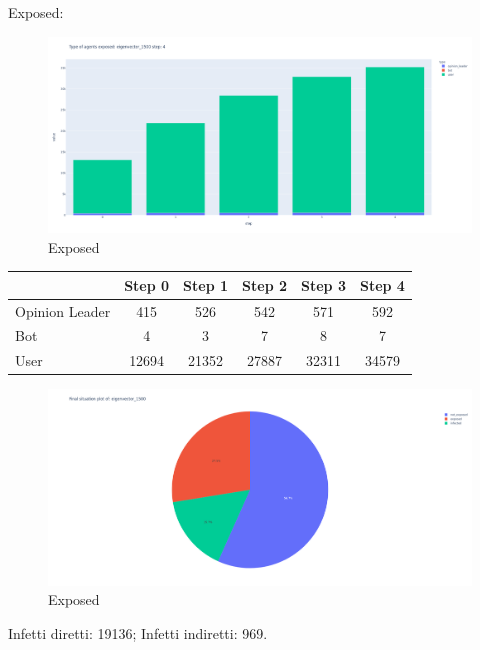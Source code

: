         Exposed:
        \begin{figure}[H]
            \includegraphics[width=16cm]{resources/charts/eig_1500_bar.png}
            \caption{Exposed}
            \label{fig:eig_1500_bar}
        \end{figure}
        
        \begin{table}[H]
            \centering
            \begin{tabular}{|l|c|c|c|c|c|}
            \hline
                           & Step 0 & Step 1 & Step 2 & Step 3 & Step 4 \\ \hline
            Opinion Leader & 415    & 526    & 542    & 571    & 592    \\ \hline
            Bot            & 4      & 3      & 7      & 8      & 7      \\ \hline
            User           & 12694  & 21352  & 27887  & 32311  & 34579  \\ \hline
            \end{tabular}
        \end{table}
        
        \begin{figure}[H]
            \includegraphics[width=16cm]{resources/charts/eig_1500_pie.png}
            \caption{Exposed}
            \label{fig:btw_1500_pie}
        \end{figure}
        Infetti diretti: 19136;\newline
        Infetti indiretti: 969.
        
